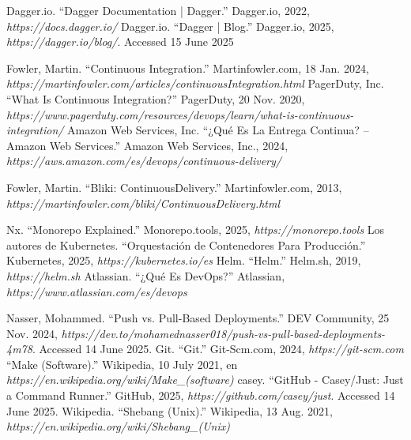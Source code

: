 

\begin{thebibliography}{99}
 Dagger.io. ``Dagger Documentation | Dagger.'' Dagger.io, 2022, {\it https://docs.dagger.io/}
 Dagger.io. “Dagger | Blog.” Dagger.io, 2025, {\it https://dagger.io/blog/}. Accessed 15 June 2025

 Fowler, Martin. ``Continuous Integration.'' Martinfowler.com, 18 Jan. 2024, {\it https://martinfowler.com/articles/continuousIntegration.html}
 PagerDuty, Inc. ``What Is Continuous Integration?'' PagerDuty, 20 Nov. 2020, {\it https://www.pagerduty.com/resources/devops/learn/what-is-continuous-integration/}
 Amazon Web Services, Inc. ``¿Qué Es La Entrega Continua? – Amazon Web Services.'' Amazon Web Services, Inc., 2024, {\it https://aws.amazon.com/es/devops/continuous-delivery/}

 Fowler, Martin. ``Bliki: ContinuousDelivery.'' Martinfowler.com, 2013, {\it https://martinfowler.com/bliki/ContinuousDelivery.html}

 Nx. ``Monorepo Explained.'' Monorepo.tools, 2025, {\it https://monorepo.tools}
 Los autores de Kubernetes. ``Orquestación de Contenedores Para Producción.'' Kubernetes, 2025, {\it https://kubernetes.io/es}
 Helm. ``Helm.'' Helm.sh, 2019, {\it https://helm.sh}
 Atlassian. ``¿Qué Es DevOps?'' Atlassian, {\it https://www.atlassian.com/es/devops}

 Nasser, Mohammed. ``Push vs. Pull-Based Deployments.'' DEV Community, 25 Nov. 2024, {\it https://dev.to/mohamednasser018/push-vs-pull-based-deployments-4m78}. Accessed 14 June 2025.
 Git. ``Git.'' Git-Scm.com, 2024, {\it https://git-scm.com}
 ``Make (Software).'' Wikipedia, 10 July 2021, en {\it https://en.wikipedia.org/wiki/Make\_(software)}
 casey. ``GitHub - Casey/Just: Just a Command Runner.'' GitHub, 2025, {\it https://github.com/casey/just}. Accessed 14 June 2025.
 Wikipedia. ``Shebang (Unix).'' Wikipedia, 13 Aug. 2021, {\it https://en.wikipedia.org/wiki/Shebang\_(Unix)}


\end{thebibliography}
